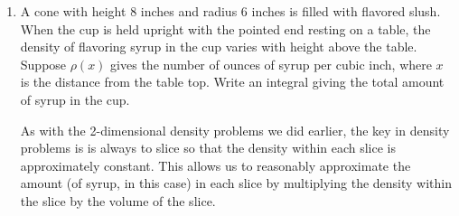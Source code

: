 \documentclass[main]{subfiles}
\begin{document}
\begin{enumerate}
 

\item  \label{density-cone-1} %
  \begin{problem}[3in]
    A cone with height $8$ inches and radius $6$ inches is filled with
    flavored slush. When the cup is held upright with the pointed end
    resting on a table, the density of flavoring syrup in the cup varies
    with height above the table.  Suppose $\rho(x)$ gives the number of
    ounces of syrup per cubic inch, where $x$ is the distance from the
    table top.  Write an integral giving the total amount of syrup in the
    cup.
  \end{problem}

  \begin{solution}
    As with the 2-dimensional density problems we did earlier, the key in
    density problems is is always to slice so that the density within each
    slice is approximately constant.  This allows us to reasonably
    approximate the amount (of syrup, in this case) in each slice by
    multiplying the density within the slice by the volume of the slice.  
    

\end{solution}
\end{enumerate}
\end{document}
